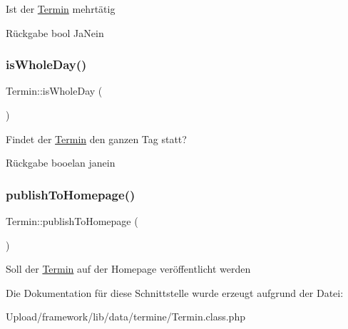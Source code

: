 Ist der \mbox{\hyperlink{interface_termin}{Termin}} mehrtätig \begin{DoxyReturn}{Rückgabe}
bool Ja\+Nein 
\end{DoxyReturn}
\mbox{\label{interface_termin_aa603cfdfcdc2f480324d94adc2e846f5}} 
\subsubsection{\texorpdfstring{is\+Whole\+Day()}{isWholeDay()}}
{\footnotesize\ttfamily Termin\+::is\+Whole\+Day (\begin{DoxyParamCaption}{ }\end{DoxyParamCaption})}

Findet der \mbox{\hyperlink{interface_termin}{Termin}} den ganzen Tag statt? \begin{DoxyReturn}{Rückgabe}
booelan janein 
\end{DoxyReturn}
\mbox{\label{interface_termin_a158a3cb7853407a73722ea80b5ef3e55}} 
\subsubsection{\texorpdfstring{publish\+To\+Homepage()}{publishToHomepage()}}
{\footnotesize\ttfamily Termin\+::publish\+To\+Homepage (\begin{DoxyParamCaption}{ }\end{DoxyParamCaption})}

Soll der \mbox{\hyperlink{interface_termin}{Termin}} auf der Homepage veröffentlicht werden 

Die Dokumentation für diese Schnittstelle wurde erzeugt aufgrund der Datei\+:\begin{DoxyCompactItemize}
\item 
Upload/framework/lib/data/termine/Termin.\+class.\+php\end{DoxyCompactItemize}
